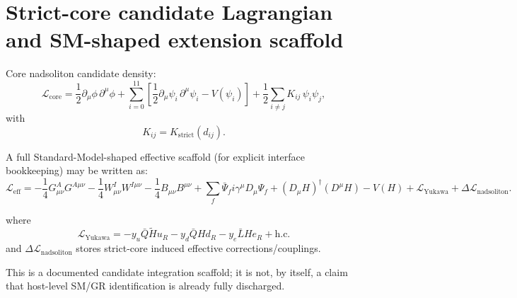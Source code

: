 \documentclass[11pt,a4paper]{article}
\begin{document}
\section{Strict-core candidate Lagrangian and SM-shaped extension scaffold}
Core nadsoliton candidate density:
\[
\mathcal{L}_{\text{core}} = \frac{1}{2}\partial_\mu\phi\,\partial^\mu\phi
+\sum_{i=0}^{11}\left[\frac{1}{2}\partial_\mu\psi_i\,\partial^\mu\psi_i - V(\psi_i)\right]
+\frac{1}{2}\sum_{i\neq j}K_{ij}\,\psi_i\psi_j,
\]
with
\[
K_{ij}=K_{\text{strict}}(d_{ij}).
\]

A full Standard-Model-shaped effective scaffold (for explicit interface bookkeeping) may be written as:
\[
\mathcal{L}_{\text{eff}}=
-\frac14 G^A_{\mu\nu}G^{A\mu\nu}
-\frac14 W^I_{\mu\nu}W^{I\mu\nu}
-\frac14 B_{\mu\nu}B^{\mu\nu}
+\sum_f \bar\Psi_f i\gamma^\mu D_\mu\Psi_f
+(D_\mu H)^\dagger(D^\mu H)-V(H)
+\mathcal{L}_{\text{Yukawa}}
+\Delta\mathcal{L}_{\text{nadsoliton}}.
\]

where
\[
\mathcal{L}_{\text{Yukawa}}=-y_u\bar Q\tilde H u_R-y_d\bar Q H d_R-y_e\bar L H e_R+\text{h.c.}
\]
and \(\Delta\mathcal{L}_{\text{nadsoliton}}\) stores strict-core induced effective corrections/couplings.

This is a documented candidate integration scaffold; it is not, by itself, a claim that host-level SM/GR identification is already fully discharged.
\end{document}
